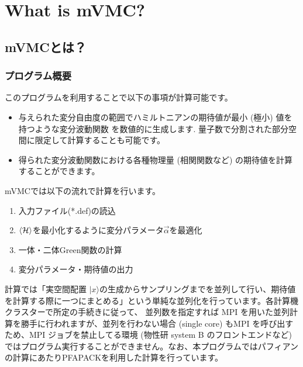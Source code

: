 \chapter{What is mVMC?}
\label{Ch:whatismVMC}
\section{mVMCとは？}
\subsection{プログラム概要}
このプログラムを利用することで以下の事項が計算可能です。
\begin{itemize}
\item{与えられた変分自由度の範囲でハミルトニアンの期待値が最小 (極小) 値を持つような変分波動関数 を数値的に生成します.   量子数で分割された部分空間に限定して計算することも可能です。}
\item{得られた変分波動関数における各種物理量 (相関関数など) の期待値を計算することができます。}
\end{itemize}
mVMCでは以下の流れで計算を行います。
\begin{enumerate}
\item{入力ファイル(*.def)の読込}
\item{$\langle {\cal H} \rangle$を最小化するように変分パラメータ$\vec{\alpha}$を最適化}
\item{一体・二体Green関数の計算}
\item{変分パラメータ・期待値の出力}
\end{enumerate}
計算では「実空間配置 $|x\rangle$の生成からサンプリングまでを並列して行い、期待値を計算する際に一つにまとめる」という単純な並列化を行っています。各計算機クラスターで所定の手続きに従って、 並列数を指定すれば MPI を用いた並列計算を勝手に行われますが、並列を行わない場合 (single core) もMPI を呼び出すため、MPI ジョブを禁止してる環境 (物性研 system B のフロントエンドなど) ではプログラム実行することができません。なお、本プログラムではパフィアンの計算にあたりPFAPACKを利用した計算を行っています\cite{PFAPACK}。

